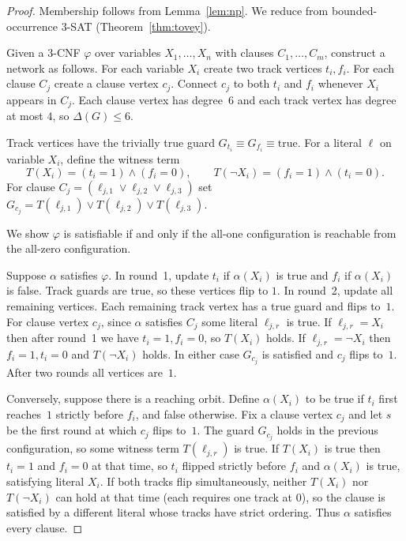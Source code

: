 \documentclass[final,3p,times]{elsarticle}
\theoremstyle{definition}
\theoremstyle{remark}
\begin{document}
\begin{proof}
Membership follows from Lemma~\ref{lem:np}.
We reduce from bounded-occurrence $3$-SAT (Theorem~\ref{thm:tovey}).

Given a $3$-CNF $\varphi$ over variables $X_1,\dots,X_n$ with clauses $C_1,\dots,C_m$, construct a network as follows.
For each variable $X_i$ create two track vertices $t_i,f_i$.
For each clause $C_j$ create a clause vertex $c_j$.
Connect $c_j$ to both $t_i$ and $f_i$ whenever $X_i$ appears in $C_j$.
Each clause vertex has degree~$6$ and each track vertex has degree at most $4$, so $\Delta(G)\le 6$.

Track vertices have the trivially true guard $G_{t_i}\equiv G_{f_i}\equiv\mathrm{true}$.
For a literal $\ell$ on variable $X_i$, define the witness term
\[
T(X_i)=(t_i{=}1)\wedge(f_i{=}0),\qquad
T(\neg X_i)=(f_i{=}1)\wedge(t_i{=}0).
\]
For clause $C_j=(\ell_{j,1}\vee\ell_{j,2}\vee\ell_{j,3})$ set $G_{c_j}=T(\ell_{j,1})\vee T(\ell_{j,2})\vee T(\ell_{j,3})$.

We show $\varphi$ is satisfiable if and only if the all-one configuration is reachable from the all-zero configuration.

Suppose $\alpha$ satisfies $\varphi$.
In round~1, update $t_i$ if $\alpha(X_i)$ is true and $f_i$ if $\alpha(X_i)$ is false.
Track guards are true, so these vertices flip to $1$.
In round~2, update all remaining vertices.
Each remaining track vertex has a true guard and flips to~$1$.
For clause vertex $c_j$, since $\alpha$ satisfies $C_j$ some literal $\ell_{j,r}$ is true.
If $\ell_{j,r}=X_i$ then after round~1 we have $t_i=1,f_i=0$, so $T(X_i)$ holds.
If $\ell_{j,r}=\neg X_i$ then $f_i=1,t_i=0$ and $T(\neg X_i)$ holds.
In either case $G_{c_j}$ is satisfied and $c_j$ flips to~$1$.
After two rounds all vertices are~$1$.

Conversely, suppose there is a reaching orbit.
Define $\alpha(X_i)$ to be true if $t_i$ first reaches~$1$ strictly before $f_i$, and false otherwise.
Fix a clause vertex $c_j$ and let $s$ be the first round at which $c_j$ flips to~$1$.
The guard $G_{c_j}$ holds in the previous configuration, so some witness term $T(\ell_{j,r})$ is true.
If $T(X_i)$ is true then $t_i=1$ and $f_i=0$ at that time, so $t_i$ flipped strictly before $f_i$ and $\alpha(X_i)$ is true, satisfying literal $X_i$.
If both tracks flip simultaneously, neither $T(X_i)$ nor $T(\neg X_i)$ can hold at that time (each requires one track at $0$), so the clause is satisfied by a different literal whose tracks have strict ordering.
Thus $\alpha$ satisfies every clause.
\end{proof}
\end{document}
